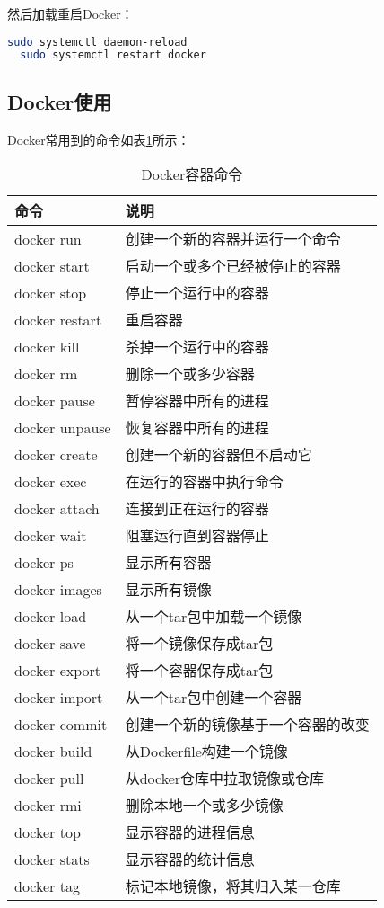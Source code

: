\documentclass[lang=cn,a4paper,newtx]{elegantpaper}
\begin{document}
然后加载重启Docker：
\begin{lstlisting}[language=bash]
  sudo systemctl daemon-reload
  sudo systemctl restart docker
\end{lstlisting}

\subsection{Docker使用}
Docker常用到的命令如表\ref{tab:docker_command}所示：
\begin{table}[hbpt]
  \centering
  \caption{Docker容器命令}
  \label{tab:docker_command}
  \begin{tabular}{p{}<{\centering}p{}<{\centering}}
    \toprule[1.5pt]
    \textbf{命令} & \textbf{说明} \\
    \midrule[1pt]
    docker run & 创建一个新的容器并运行一个命令 \\
    docker start & 启动一个或多个已经被停止的容器 \\
    docker stop & 停止一个运行中的容器 \\
    docker restart & 重启容器 \\
    docker kill & 杀掉一个运行中的容器 \\
    docker rm & 删除一个或多少容器 \\
    docker pause & 暂停容器中所有的进程 \\
    docker unpause & 恢复容器中所有的进程 \\
    docker create & 创建一个新的容器但不启动它 \\
    docker exec & 在运行的容器中执行命令 \\
    docker attach & 连接到正在运行的容器 \\
    docker wait & 阻塞运行直到容器停止 \\
    docker ps & 显示所有容器 \\
    docker images & 显示所有镜像 \\
    docker load & 从一个tar包中加载一个镜像 \\
    docker save & 将一个镜像保存成tar包 \\
    docker export & 将一个容器保存成tar包 \\
    docker import & 从一个tar包中创建一个容器 \\
    docker commit & 创建一个新的镜像基于一个容器的改变 \\
    docker build & 从Dockerfile构建一个镜像 \\
    docker pull & 从docker仓库中拉取镜像或仓库 \\
    docker rmi & 删除本地一个或多少镜像 \\
    docker top & 显示容器的进程信息 \\
    docker stats & 显示容器的统计信息 \\
    docker tag & 标记本地镜像，将其归入某一仓库 \\
    \bottomrule[1.5pt]
  \end{tabular}
\end{table}
\end{document}
